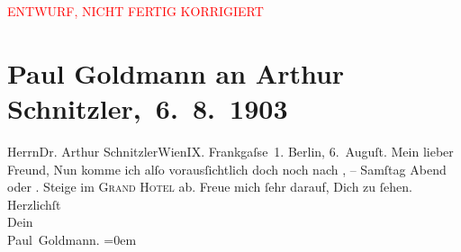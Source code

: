
\begin{center}
            \textcolor{red}{ENTWURF, NICHT FERTIG KORRIGIERT}
                      \end{center}
            
         \renewcommand{\erwaehnteOrte}{Orte: Berlin, Frankgasse, Grand Hotel Wien, Wien}
         \renewcommand{\erwaehnteWerke}{}
               \section[ Paul Goldmann an Arthur Schnitzler, 6. 8. 1903]{ Paul Goldmann an Arthur Schnitzler, 6. 8. 1903}\nopagebreak{}\rehead{ }\begin{ledgroupsized}[t]{13cm}\normalsize\beginnumbering \toendnotes[C]{\smallbreak\pagebreak[2]} 
\toendnotes[C]{\smallbreak}\pstart{}{\pb}Herrn\pend{}\pstart{}Dr. Arthur Schnitzler\pend{}\pstart{}Wien\pend{}\pstart{}IX. Frankgaſse 1.\pend{}{\bigskip}\pstart
           {\pb}Berlin, 6. Auguſt.\pend
           \pstart{}Mein lieber Freund,\pend\pstart
           Nun komme ich alſo vorausſichtlich doch noch nach \label{K_L03381-1v}\label{K_L03381-1h}, – Samſtag{ }Abend oder \label{K_L03381-3v}\label{K_L03381-3h}. Steige im \textsc{Grand Hotel} ab. Freue mich ſehr darauf, Dich zu ſehen.\pend
           \pstart
           Herzlichſt {\\[\baselineskip]}Dein {\\[\baselineskip]}\spacefill\mbox{Paul Goldmann.}\pend
           \leftskip=0em{}
         
         \endnumbering{}\end{ledgroupsized}  \newcommand{\dateiname}{L03381}\newcommand{\titel}{Paul Goldmann an Arthur Schnitzler, 6. 8. 1903}\newcommand{\editorInnen}{Martin Anton Müller und Laura Untner}
      